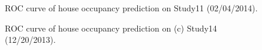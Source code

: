 \begin{figure}[h]
	\caption{
	ROC curve of house occupancy prediction on Study11 (02/04/2014).
}
	\label{fig_rocresults_2}
\end{figure}

\begin{figure}[h]
	\caption{
	ROC curve of house occupancy prediction on (c) Study14 (12/20/2013).
}
	\label{fig_rocresults_3}
\end{figure}


